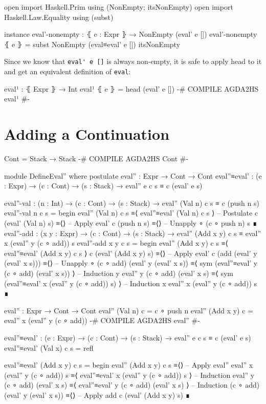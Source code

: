 \documentclass{article}
\begin{document}
\begin{code}
open import Haskell.Prim using (NonEmpty; itsNonEmpty)
open import Haskell.Law.Equality using (subst)

instance
  eval'-nonempty : ⦃ e : Expr ⦄ → NonEmpty (eval' e [])
  eval'-nonempty ⦃ e ⦄ = subst NonEmpty (eval≡eval' e []) itsNonEmpty
\end{code}

\noindent
Since we know that \verb!eval' e []! is always non-empty, it is safe to apply head to it and get an equivalent definition of \texttt{eval}:

\begin{code}
eval¹ : ⦃ Expr ⦄ → Int
eval¹ ⦃ e ⦄ = head (eval' e [])
{-# COMPILE AGDA2HS eval¹ #-}
\end{code}

\section{Adding a Continuation}

\begin{code}
Cont = Stack → Stack
{-# COMPILE AGDA2HS Cont #-}

module DefineEval'' where
  postulate
    eval'' : Expr → Cont → Cont
    eval''≡eval' : (e : Expr) → (c : Cont) → (s : Stack)
      → eval'' e c s ≡ c (eval' e s)

  eval''-val : (n : Int) → (c : Cont) → (s : Stack)
    → eval'' (Val n) c s ≡ c (push n s)
  eval''-val n c s =
    begin
      eval'' (Val n) c s
    ≡⟨ eval''≡eval' (Val n) c s ⟩ -- Postulate
      c (eval' (Val n) s)
    ≡⟨⟩ -- Apply eval'
      c (push n s)
    ≡⟨⟩ -- Unapply ∘
      (c ∘ push n) s
    ∎
  eval''-add : (x y : Expr) → (c : Cont) → (s : Stack)
    → eval'' (Add x y) c s ≡ eval'' x (eval'' y (c ∘ add)) s
  eval''-add x y c s =
    begin
      eval'' (Add x y) c s
    ≡⟨ eval''≡eval' (Add x y) c s ⟩
      c (eval' (Add x y) s)
    ≡⟨⟩ -- Apply eval'
      c (add (eval' y (eval' x s)))
    ≡⟨⟩ -- Unapply ∘
      (c ∘ add) (eval' y (eval' x s))
    ≡⟨ sym (eval''≡eval' y (c ∘ add) (eval' x s)) ⟩ -- Induction y
      eval'' y (c ∘ add) (eval' x s)
    ≡⟨ sym (eval''≡eval' x (eval'' y (c ∘ add)) s) ⟩ -- Induction x
      eval'' x (eval'' y (c ∘ add)) s
    ∎
\end{code}
\begin{code}
eval'' : Expr → Cont → Cont
eval'' (Val n) c = c ∘ push n
eval'' (Add x y) c = eval'' x (eval'' y (c ∘ add))
{-# COMPILE AGDA2HS eval'' #-}
\end{code}
\begin{code}
eval''≡eval' : (e : Expr) → (c : Cont) → (s : Stack)
  → eval'' e c s ≡ c (eval' e s)
eval''≡eval' (Val x) c s = refl
\end{code}
\begin{code}
eval''≡eval' (Add x y) c s =
  begin
    eval'' (Add x y) c s
  ≡⟨⟩ -- Apply eval''
    eval'' x (eval'' y (c ∘ add)) s
  ≡⟨ eval''≡eval' x (eval'' y (c ∘ add)) s ⟩ -- Induction
    eval'' y (c ∘ add) (eval' x s)
  ≡⟨ eval''≡eval' y (c ∘ add) (eval' x s) ⟩ -- Induction
    (c ∘ add) (eval' y (eval' x s))
  ≡⟨⟩ -- Apply add
    c (eval' (Add x y) s)
  ∎
\end{code}
\end{document}
